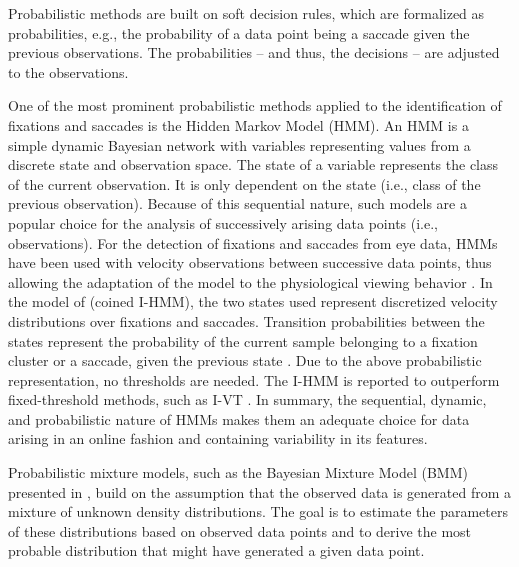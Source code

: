 \documentclass[preprint,12pt]{elsarticle}
\begin{document}
Probabilistic methods are built on soft decision rules, which are formalized as probabilities, e.g.,  the probability of a data point being a saccade given the previous observations. The probabilities – and thus, the decisions – are adjusted to the observations.

One of the most prominent probabilistic methods applied to the identification of fixations and saccades is the Hidden Markov Model (HMM).
An HMM is a simple dynamic Bayesian network with variables representing values from a discrete state and observation space.
The state of a variable represents the class of the current observation. It is only dependent on the state (i.e., class of the previous observation).
Because of this sequential nature, such models are a popular choice for the analysis of successively arising data points (i.e., observations).
For the detection of fixations and saccades from eye data, HMMs have been used with velocity observations between successive data points,
thus allowing the adaptation of the model to the physiological viewing behavior \cite{Salvucci:2000:IFS:355017.355028}.
In the model of \cite{Salvucci:2000:IFS:355017.355028} (coined I-HMM),
the two states used represent discretized velocity distributions over fixations and saccades.
Transition probabilities between the states represent the probability of the current sample belonging to a fixation cluster or a saccade,
given the previous state \cite{holmqvist-eye-tracking-a-comprehensive-guide-to-methods-and-measures}.
Due to the above probabilistic representation, no thresholds are needed.
The I-HMM is reported to outperform fixed-threshold methods,
such as I-VT \cite{Salvucci:2000:IFS:355017.355028}.
In summary, the sequential, dynamic,
and probabilistic nature of HMMs makes them an adequate choice for data arising in an online fashion and containing variability in its features.

Probabilistic mixture models, such as the Bayesian Mixture Model (BMM) presented in \cite{Tafaj:2012:BOC:2168556.2168617},
build on the assumption that the observed data is generated from a mixture of unknown density distributions.
The goal is to estimate the parameters of these distributions based on observed data points and to derive the most probable distribution that might have generated a given data point.
\end{document}

